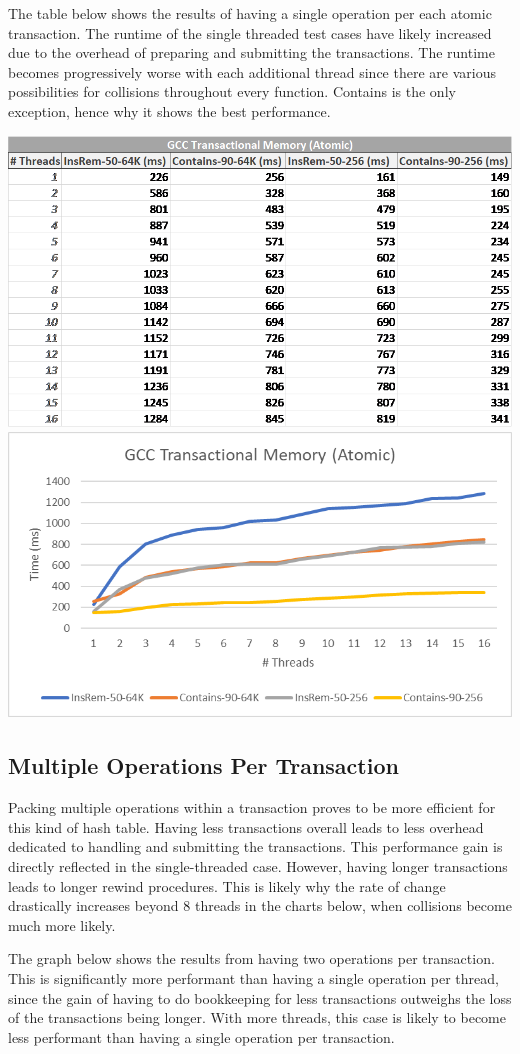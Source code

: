 \documentclass[11pt]{article} %
\begin{document}
The table below shows the results of having a single operation per each atomic transaction. The runtime of the single threaded test cases have likely increased due to the overhead of preparing and submitting the transactions. The runtime becomes progressively worse with each additional thread since there are various possibilities for collisions throughout every function. Contains is the only exception, hence why it shows the best performance.

\bigskip
\includegraphics[width=0.5\linewidth]{Table1.png}
\includegraphics[width=0.5\linewidth]{Graph1.png}

\subsection{Multiple Operations Per Transaction}

Packing multiple operations within a transaction proves to be more efficient for this kind of hash table. Having less transactions overall leads to less overhead dedicated to handling and submitting the transactions. This performance gain is directly reflected in the single-threaded case. However, having longer transactions leads to longer rewind procedures. This is likely why the rate of change drastically increases beyond 8 threads in the charts below, when collisions become much more likely.

The graph below shows the results from having two operations per transaction. This is significantly more performant than having a single operation per thread, since the gain of having to do bookkeeping for less transactions outweighs the loss of the transactions being longer. With more threads, this case is likely to become less performant than having a single operation per transaction.
\end{document}
